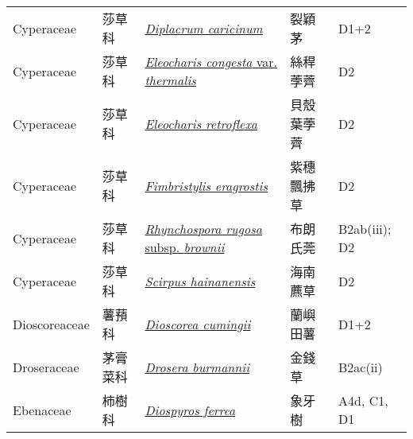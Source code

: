{\begin{longtable}{L{2.5cm}L{2cm}L{5cm}L{2.5cm}L{3cm}}
    Cyperaceae & 莎草科 & \href{http://www.theplantlist.org/tpl1.1/search?q=Diplacrum+caricinum}{\textit{Diplacrum caricinum} } & 裂穎茅 & D1+2    \\
    Cyperaceae & 莎草科 & \href{http://www.theplantlist.org/tpl1.1/search?q=Eleocharis+congesta+var.+thermalis}{\textit{Eleocharis congesta} var. \textit{thermalis} } & 絲稈荸薺 & D2    \\
    Cyperaceae & 莎草科 & \href{http://www.theplantlist.org/tpl1.1/search?q=Eleocharis+retroflexa}{\textit{Eleocharis retroflexa} } & 貝殼葉荸薺 & D2    \\
    Cyperaceae & 莎草科 & \href{http://www.theplantlist.org/tpl1.1/search?q=Fimbristylis+eragrostis}{\textit{Fimbristylis eragrostis} } & 紫穗飄拂草 & D2    \\
    Cyperaceae & 莎草科 & \href{http://www.theplantlist.org/tpl1.1/search?q=Rhynchospora+rugosa+subsp.+brownii}{\textit{Rhynchospora rugosa} subsp. \textit{brownii} } & 布朗氏莞 & B2ab(iii); D2    \\
    Cyperaceae & 莎草科 & \href{http://www.theplantlist.org/tpl1.1/search?q=Scirpus+hainanensis}{\textit{Scirpus hainanensis} } & 海南藨草 & D2    \\
    Dioscoreaceae & 薯蕷科 & \href{http://www.theplantlist.org/tpl1.1/search?q=Dioscorea+cumingii}{\textit{Dioscorea cumingii} } & 蘭嶼田薯 & D1+2    \\
    Droseraceae & 茅膏菜科 & \href{http://www.theplantlist.org/tpl1.1/search?q=Drosera+burmannii}{\textit{Drosera burmannii} } & 金錢草 & B2ac(ii)    \\
    Ebenaceae & 柿樹科 & \href{http://www.theplantlist.org/tpl1.1/search?q=Diospyros+ferrea}{\textit{Diospyros ferrea} } & 象牙樹 & A4d, C1, D1    \\

\end{longtable}}
